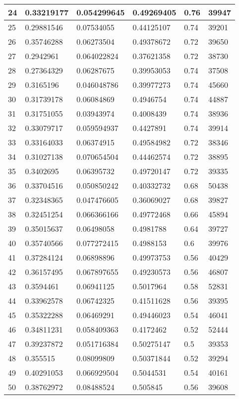 \begin{longtable}{|l|l|l|l|l|l|}
24 & 0.33219177 & 0.054299645 & 0.49269405 & 0.76 & 39947 \\ \hline 
25 & 0.29881546 & 0.07534055 & 0.44125107 & 0.74 & 39201 \\ \hline 
26 & 0.35746288 & 0.06273504 & 0.49378672 & 0.72 & 39650 \\ \hline 
27 & 0.2942961 & 0.064022824 & 0.37621358 & 0.72 & 38730 \\ \hline 
28 & 0.27364329 & 0.06287675 & 0.39953053 & 0.74 & 37508 \\ \hline 
29 & 0.3165196 & 0.046048786 & 0.39977273 & 0.74 & 45660 \\ \hline 
30 & 0.31739178 & 0.06084869 & 0.4946754 & 0.74 & 44887 \\ \hline 
31 & 0.31751055 & 0.03943974 & 0.4008439 & 0.74 & 38936 \\ \hline 
32 & 0.33079717 & 0.059594937 & 0.4427891 & 0.74 & 39914 \\ \hline 
33 & 0.33164033 & 0.06374915 & 0.49584982 & 0.72 & 38346 \\ \hline 
34 & 0.31027138 & 0.070654504 & 0.44462574 & 0.72 & 38895 \\ \hline 
35 & 0.3402695 & 0.06395732 & 0.49720147 & 0.72 & 39335 \\ \hline 
36 & 0.33704516 & 0.050850242 & 0.40332732 & 0.68 & 50438 \\ \hline 
37 & 0.32348365 & 0.047476605 & 0.36069027 & 0.68 & 39827 \\ \hline 
38 & 0.32451254 & 0.066366166 & 0.49772468 & 0.66 & 45894 \\ \hline 
39 & 0.35015637 & 0.06498058 & 0.4981788 & 0.64 & 39727 \\ \hline 
40 & 0.35740566 & 0.077272415 & 0.4988153 & 0.6 & 39976 \\ \hline 
41 & 0.37284124 & 0.06898896 & 0.49973753 & 0.56 & 40429 \\ \hline 
42 & 0.36157495 & 0.067897655 & 0.49230573 & 0.56 & 46807 \\ \hline 
43 & 0.3594461 & 0.06941125 & 0.5017964 & 0.58 & 52831 \\ \hline 
44 & 0.33962578 & 0.06742325 & 0.41511628 & 0.56 & 39395 \\ \hline 
45 & 0.35322288 & 0.06469291 & 0.49446023 & 0.54 & 46041 \\ \hline 
46 & 0.34811231 & 0.058409363 & 0.4172462 & 0.52 & 52444 \\ \hline 
47 & 0.39237872 & 0.051716384 & 0.50275147 & 0.5 & 39353 \\ \hline 
48 & 0.355515 & 0.08099809 & 0.50371844 & 0.52 & 39294 \\ \hline 
49 & 0.40291053 & 0.066929504 & 0.5044531 & 0.54 & 40161 \\ \hline 
50 & 0.38762972 & 0.08488524 & 0.505845 & 0.56 & 39608 \\ \hline 
\end{longtable}